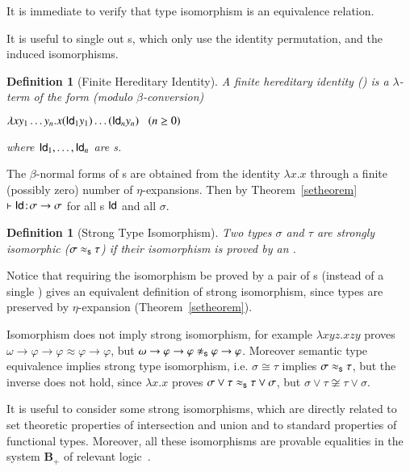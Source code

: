 \documentclass[UKenglish]{eptcs}
\newtheorem{definition}[fact]{Definition}
\newcommand{\dup}{\! : \!}
\newcommand{\fhp}{\text{\small FHP}}   \newcommand{\fhi}{\text{\small FHI}}   \newcommand{\CC}{\mathcal{C}}
\newcommand{\tA}{\sigma}       \newcommand{\tB}{\tau}
\newcommand{\tu}{\omega}
\newcommand{\iso}{\approx}
\newcommand{\id}{{\sf Id}}
\newcommand{\labelx}[1]{\label{#1}}
\newcommand{\isos}{\approx_{\sf s}}
\newcommand{\myformula}[1]{\\[0.5pt]\centerline{#1}}
\newcommand{\esim}{\cong}
\begin{document}
\smallskip

\noindent
It is immediate to verify that type isomorphism is an equivalence relation.

\smallskip

It is useful to single out \fhp s, which only use the identity permutation, and the induced isomorphisms.

\begin{definition} [Finite Hereditary Identity]\labelx{fhi}
A {\em finite hereditary identity} (\fhi) is a $\lambda$-term of the form (modulo $\beta$-conversion)
\myformula{$\lambda x y_{1}\dots y_{n}.x(\id_1 y_{1})\dots (\id_n y_{n}) \; \; \;(n \geq  0)$}
where $\id_1,\ldots,\id_n$ are \fhi s.
\end{definition}
\noindent
The  $\beta$-normal forms of \fhi s are  obtained from the identity $\lambda x.x$ through a finite (possibly zero) number of $\eta$-expansions. Then by Theorem~\ref{setheorem} $\vdash \id\dup\tA\to\tA$ for all \fhi s $\id$ and all $\tA$.

\begin{definition} [Strong Type Isomorphism]\labelx{sti}
Two types $\sigma$  and  $\tau$ are {\em strongly isomorphic} ($
\sigma \isos \tau$) if their isomorphism is proved by an \fhi.
\end{definition}

Notice that
requiring the isomorphism be proved by a pair of \fhi s (instead of a single \fhi) gives an equivalent definition of strong isomorphism, since types are preserved by $\eta$-expansion (Theorem~\ref{setheorem}).

\smallskip

Isomorphism does not imply strong isomorphism, for example $\lambda xyz.xzy$ proves $\tu\to\varphi\to\varphi\iso\varphi\to\varphi$, but $\tu\to\varphi\to\varphi\not\isos\varphi\to\varphi$.
Moreover semantic type equivalence implies strong type isomorphism, i.e. $\tA\esim\tB$ implies $\tA\isos\tB$, but   the inverse does not hold, since $\lambda x.x$ proves $\tA\vee\tB\isos\tB\vee\tA$, but $\tA\vee\tB\not\esim\tB\vee\tA$.

\smallskip

      It is useful to consider some strong isomorphisms, which are directly related to set theoretic properties of intersection and union and to standard properties of functional types. Moreover, all these isomorphisms are provable equalities in the system {\bf B$_+$} of relevant logic~\cite{SE3}.
\end{document}
